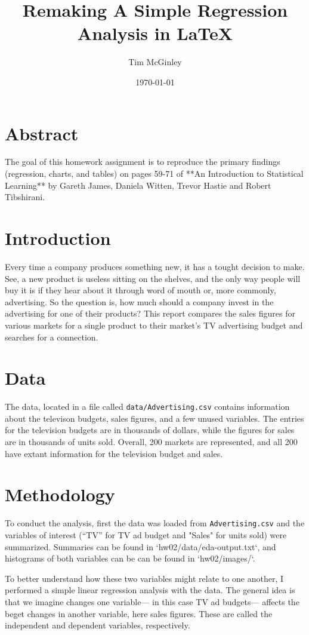 \documentclass{article}
\title{Remaking A Simple Regression Analysis in LaTeX}
\author{Tim McGinley}
\begin{document}

\date{\today}
\maketitle


\section{Abstract}
The goal of this homework assignment is to reproduce the primary findings (regression, charts, and tables) on pages 59-71 of **An Introduction to Statistical Learning** by Gareth James, Daniela Witten, Trevor Hastie and Robert Tibshirani.


\section{Introduction}
Every time a company produces something new, it has a tought decision to make.  See, a new product is useless sitting on the shelves, and the only way people will buy it is if they hear about it through word of mouth or, more commonly, advertising.  So the question is, how much should a company invest in the advertising for one of their products? This report compares the sales figures for various markets for a single product to their market's TV advertising budget and searches for a connection. 

\section{Data}
The data, located in a file called \texttt{data/Advertising.csv} contains information about the televison budgets, sales figures, and a few unused variables.  The entries for the television budgets are in thousands of dollars, while the figures for sales are in thousands of units sold. Overall, 200 markets are represented, and all 200 have extant information for the television budget and sales. 

\section{Methodology}
To conduct the analysis, first the data was loaded from \texttt{Advertising.csv} and the variables of interest (``TV'' for TV ad budget and "Sales" for units sold) were summarized. Summaries can be found in 
`hw02/data/eda-output.txt`, and histograms of both variables can be can be found in `hw02/images/`.  

To better understand how these two variables might relate to one another, I performed a simple linear regression analysis with the data.  The general idea is that we imagine changes one variable— in this case TV ad budgets— affects the beget changes in another variable, here sales figures. These are called the independent and dependent variables, respectively.  
\end{document}
